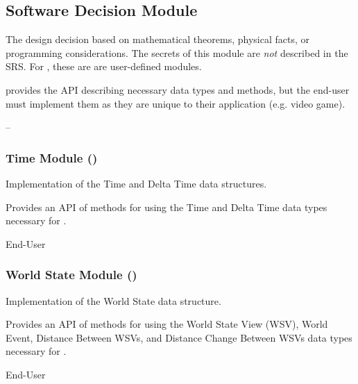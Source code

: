\subsection{Software Decision Module}

\begin{description}[font=\scshape]
    \item[Secrets:] The design decision based on mathematical theorems,
    physical facts, or programming considerations. The secrets of this module
    are \emph{not} described in the SRS. For \progname{}, these are are
    user-defined modules.

    \item[Services:] \progname{} provides the API describing necessary data
    types and methods, but the end-user must implement them as they are unique
    to their application (e.g. video game).

    \item[Implemented By:] --
\end{description}

\subsubsection{Time Module ()}

\begin{description}[font=\scshape]
    \item[Secrets:] Implementation of the Time and Delta Time data structures.

    \item[Services:]  Provides an API of methods for using the Time and Delta
    Time data types necessary for \progname{}.

    \item[Implemented By:] End-User
\end{description}

\subsubsection{World State Module ()}

\begin{description}[font=\scshape]
    \item[Secrets:] Implementation of the World State data structure.

    \item[Services:] Provides an API of methods for using the World State View
    (WSV), World Event, Distance Between WSVs, and Distance Change Between WSVs
    data types necessary for \progname{}.

    \item[Implemented By:] End-User
\end{description}